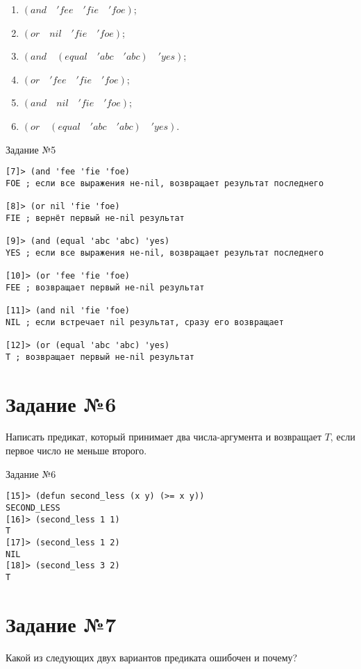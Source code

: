 \begin{enumerate}
	\item $(and \quad 'fee \quad 'fie \quad 'foe)$;
	\item $(or \quad nil \quad 'fie \quad 'foe)$;
	\item $(and \quad (equal \quad 'abc \quad 'abc) \quad 'yes)$;
	\item $(or \quad 'fee \quad 'fie \quad 'foe)$;
	\item $(and \quad nil \quad 'fie \quad 'foe)$;
	\item $(or \quad (equal \quad 'abc \quad 'abc) \quad 'yes)$.
\end{enumerate}

\begin{code}
\caption{Задание №5}
\label{code:bf5}
\begin{verbatim}
[7]> (and 'fee 'fie 'foe)
FOE ; если все выражения не-nil, возвращает результат последнего

[8]> (or nil 'fie 'foe)
FIE ; вернёт первый не-nil результат

[9]> (and (equal 'abc 'abc) 'yes)
YES ; если все выражения не-nil, возвращает результат последнего

[10]> (or 'fee 'fie 'foe)
FEE ; возвращает первый не-nil результат

[11]> (and nil 'fie 'foe)
NIL ; если встречает nil результат, сразу его возвращает

[12]> (or (equal 'abc 'abc) 'yes)
T ; возвращает первый не-nil результат
\end{verbatim}
\end{code}

\section{Задание №6}
Написать предикат, который принимает два числа-аргумента и возвращает $T$, если первое число не меньше второго.

\begin{code}
\caption{Задание №6}
\label{code:bf4}
\begin{verbatim}
[15]> (defun second_less (x y) (>= x y))
SECOND_LESS
[16]> (second_less 1 1)
T
[17]> (second_less 1 2)
NIL
[18]> (second_less 3 2)
T
\end{verbatim}
\end{code}

\section{Задание №7}
Какой из следующих двух вариантов предиката ошибочен и почему? 

